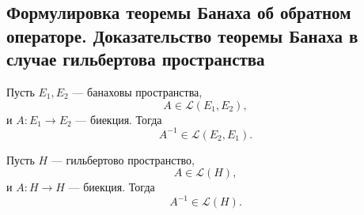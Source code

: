 \providecommand{\K}{\mathbb{K}}

\subsection{Формулировка теоремы Банаха об обратном операторе.
	Доказательство теоремы Банаха в случае гильбертова пространства}

\begin{theorem}
	Пусть \(E_1,E_2\) --- банаховы пространства,
	\[
	A\in\mathcal{L}(E_1,E_2),
	\]
	и \(A:E_1\to E_2\) --- биекция. Тогда
	\[
	A^{-1}\in\mathcal{L}(E_2,E_1).
	\]
\end{theorem}

\begin{theorem}
	Пусть \(H\) --- гильбертово пространство,
	\[
	A\in\mathcal{L}(H),
	\]
	и \(A:H\to H\) --- биекция. Тогда
	\[
	A^{-1}\in\mathcal{L}(H).
	\]
\end{theorem}

